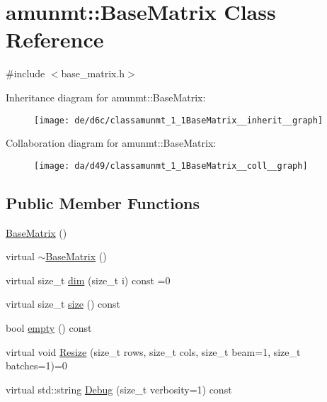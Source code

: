 \hypertarget{classamunmt_1_1BaseMatrix}{}\section{amunmt\+:\+:Base\+Matrix Class Reference}
\label{classamunmt_1_1BaseMatrix}


{\ttfamily \#include $<$base\+\_\+matrix.\+h$>$}



Inheritance diagram for amunmt\+:\+:Base\+Matrix\+:
\nopagebreak
\begin{figure}[H]
\begin{center}
\leavevmode
\texttt{[image: de/d6c/classamunmt\_1\_1BaseMatrix\_\_inherit\_\_graph]}
\end{center}
\end{figure}


Collaboration diagram for amunmt\+:\+:Base\+Matrix\+:
\nopagebreak
\begin{figure}[H]
\begin{center}
\leavevmode
\texttt{[image: da/d49/classamunmt\_1\_1BaseMatrix\_\_coll\_\_graph]}
\end{center}
\end{figure}
\subsection*{Public Member Functions}
\begin{DoxyCompactItemize}
\item 
\hyperlink{classamunmt_1_1BaseMatrix_a4be3ab768df6a7039efbb14d43463a2c}{Base\+Matrix} ()
\item 
virtual \hyperlink{classamunmt_1_1BaseMatrix_afb3ba3f074a7464fbb991cb467c7e84d}{$\sim$\+Base\+Matrix} ()
\item 
virtual size\+\_\+t \hyperlink{classamunmt_1_1BaseMatrix_a8fca680b1a864b3d99e9cfe6aa60f1d4}{dim} (size\+\_\+t i) const =0
\item 
virtual size\+\_\+t \hyperlink{classamunmt_1_1BaseMatrix_a52ccc5b9234726532fe0452a8aed5b1f}{size} () const 
\item 
bool \hyperlink{classamunmt_1_1BaseMatrix_a340cbf16c47ba57d32cab301705f7776}{empty} () const 
\item 
virtual void \hyperlink{classamunmt_1_1BaseMatrix_a4cb69cec51d0849c2e9126131265a044}{Resize} (size\+\_\+t rows, size\+\_\+t cols, size\+\_\+t beam=1, size\+\_\+t batches=1)=0
\item 
virtual std\+::string \hyperlink{classamunmt_1_1BaseMatrix_ae7601bd2c92e0102c263e143c36fb6cd}{Debug} (size\+\_\+t verbosity=1) const 
\end{DoxyCompactItemize}


